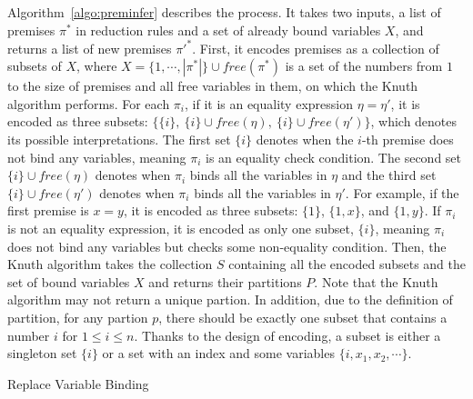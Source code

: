 Algorithm~\ref{algo:preminfer} describes the process.
It takes two inputs, a list of premises $\pi^*$ in reduction rules
and a set of already bound variables $X$, and returns a list of new premises $\pi'^*$.
First, it encodes premises as a collection of subsets of $X$,
where $X = \{1, \cdots, |\pi^*|\} \cup \mathit{free}(\pi^*)$
is a set of the numbers from $1$ to the size of premises
and all free variables in them, on which the Knuth algorithm performs.
For each $\pi_i$, if it is an equality expression $\eta = \eta'$,
it is encoded as three subsets: $\{\{i\},\ \{i\}\cup\mathit{free}(\eta),\ \{i\}\cup\mathit{free}(\eta')\}$,
which denotes its possible interpretations.
The first set $\{i\}$ denotes when the $i$-th premise does not bind any variables,
meaning $\pi_i$ is an equality check condition.
The second set $\{i\} \cup \mathit{free}(\eta)$ denotes when $\pi_i$ binds all the variables in $\eta$ and
the third set $\{i\} \cup \mathit{free}(\eta')$ denotes when $\pi_i$ binds all the variables in $\eta'$.
For example, if the first premise is $x = y$, it is encoded as three subsets: $\{1\}$, $\{1, x\}$, and $\{1, y\}$.
If $\pi_i$ is not an equality expression, it is encoded as only one subset, $\{i\}$,
meaning $\pi_i$ does not bind any variables but checks some non-equality condition.
Then, the Knuth algorithm takes the collection $S$ containing all the encoded subsets and
the set of bound variables $X$ and returns their partitions $P$.
Note that the Knuth algorithm may not return a unique partion.
In addition, due to the definition of partition, for any partion $p$,
there should be exactly one subset that contains a number $i$ for $1 \le i \le n$.
Thanks to the design of encoding, a subset is either a singleton set $\{i\}$ or
a set with an index and some variables $\{i, x_1, x_2, \cdots\}$.

\begin{algorithm}[t]
\DontPrintSemicolon
{}
 {
}
\caption{Replace Variable Binding}
\label{algo:binding}
\end{algorithm}

